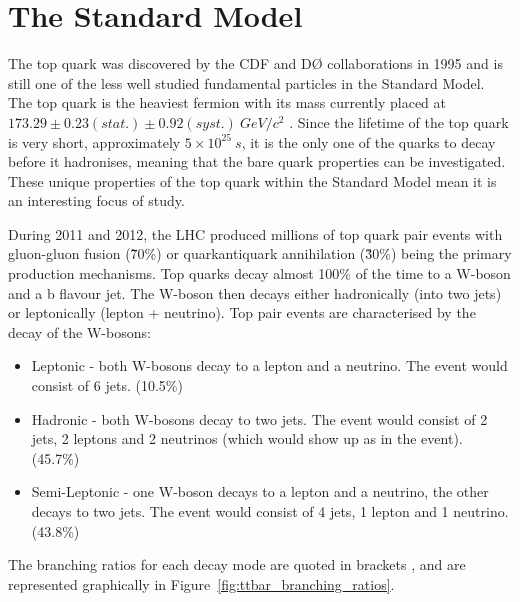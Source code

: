 \chapter{The Standard Model}
\label{c:the_standard_model}

The top quark was discovered by the CDF and D{\O} collaborations in 1995 and is still one of the less
well studied fundamental particles in the Standard Model. The top quark is the heaviest fermion with its mass
currently placed at $173.29 \pm 0.23 (stat.) \pm 0.92 (syst.)~GeV/c^{2}$ \cite{top_mass}. Since the lifetime
of the top quark is very short, approximately $5 \times 10^{25}~s$, it is the only one of the quarks to decay
before it hadronises, meaning that the bare quark properties can be investigated. These unique properties of
the top quark within the Standard Model mean it is an interesting focus of study.

During 2011 and 2012, the LHC produced millions of top quark pair events with gluon-gluon fusion (\~70\%) or
quark\-anti\-quark annihilation (\~30\%) being the primary production mechanisms. Top quarks decay almost
100\% of the time to a W-boson and a b flavour jet. The W-boson then decays either hadronically (into two
jets) or leptonically (lepton + neutrino). Top pair events are characterised by the decay of the W-bosons:
\begin{itemize}
  \item Leptonic - both W-bosons decay to a lepton and a neutrino. The event would consist of 6 jets. (10.5\%)
  \item Hadronic - both W-bosons decay to two jets. The event would consist of 2 jets, 2 leptons and 2
  neutrinos (which would show up as \met in the event). (45.7\%)
  \item Semi-Leptonic - one W-boson decays to a lepton and a neutrino, the other decays to two jets. The
  event would consist of 4 jets, 1 lepton and 1 neutrino. (43.8\%)
\end{itemize}

The branching ratios for each decay mode are quoted in brackets \cite{PDG}, and are represented graphically in
Figure~\ref{fig:ttbar_branching_ratios}.

